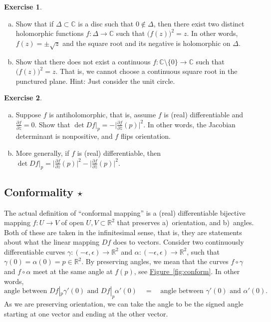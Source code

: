 \documentclass[12pt,openany]{book}
\newcommand{\babs}[1]{\bigl\lvert {#1} \bigr\rvert}
\newcommand{\C}{{\mathbb{C}}}
\newcommand{\R}{{\mathbb{R}}}
\newcommand{\myquote}[1]{``#1''}
\theoremstyle{plain}
\theoremstyle{remark}
\theoremstyle{definition}
\newenvironment{exbox}{%
    \def\FrameCommand{\vrule width 1pt \relax\hspace{10pt}}%
    \MakeFramed{\advance\hsize-\width\FrameRestore}%
}{%
    \endMakeFramed
}
\newenvironment{exparts}{%
    \leavevmode\begin{enumerate}[a),noitemsep,topsep=0pt,parsep=0pt,partopsep=0pt]
}{%
    \end{enumerate}
}
\theoremstyle{exercise}
\newtheorem{exercise}{Exercise}[section]
\theoremstyle{example}
\newcommand{\figureref}[1]{\hyperref[#1]{Figure~\ref*{#1}}}
\begin{document}
\begin{exbox}
\begin{exercise}
\begin{exparts}
\item
Show that if $\Delta \subset \C$ is a disc such that $0 \notin \Delta$, then
there exist two distinct holomorphic functions $f \colon \Delta \to \C$ such that
${\bigl(f(z)\bigr)}^2 = z$.  In other words, $f(z) = \pm \sqrt{z}$ and the
square root and its negative is holomorphic on $\Delta$.
\item
Show that there does not exist a continuous $f \colon \C \setminus \{ 0 \}
\to \C$ such that ${\bigl(f(z)\bigr)}^2 = z$.  That is, we cannot choose a
continuous square root in the punctured plane.  Hint: Just consider the unit
circle.
\end{exparts}
\end{exercise}

\begin{exercise}
\begin{exparts}
\item
Suppose $f$ is antiholomorphic, that is, assume $f$ is (real) differentiable
and $\frac{\partial f}{\partial z} = 0$.  Show that
$\det Df\big|_p = - \babs{\frac{\partial f}{\partial \bar{z}}(p)}^2$.  In other words,
the Jacobian determinant is nonpositive, and $f$ flips orientation.
\item
More generally, if $f$ is (real) differentiable, then
$\det Df\big|_p = \babs{\frac{\partial f}{\partial z}(p)}^2 -
\babs{\frac{\partial f}{\partial \bar{z}}(p)}^2$.
\end{exparts}
\end{exercise}
\end{exbox}

\subsection{Conformality \texorpdfstring{$\star$}{*}}

The actual definition of \myquote{conformal mapping} is 
a (real) differentiable bijective mapping $f \colon U \to V$ of open
$U, V \subset \R^2$ that preserves
a)~orientation, and b)~angles.
Both of these are taken in the infinitesimal sense, that is, they are
statements about what the linear mapping $Df$ does to vectors.
Consider two continuously differentiable curves
$\gamma \colon (-\epsilon,\epsilon) \to \R^2$ and
$\alpha \colon (-\epsilon,\epsilon) \to \R^2$, such that
$\gamma(0)=\alpha(0) = p \in \R^2$.  By preserving angles, we
mean that the curves $f \circ \gamma$ and $f \circ \alpha$ meet at the same
angle at $f(p)$, see \figureref{fig:conform}.  In other words,
\begin{equation*}
\text{angle between } Df|_p \gamma'(0) \text{ and }
Df|_p \alpha'(0)
\quad = \quad
\text{angle between } \gamma'(0) \text{ and } \alpha'(0) .
\end{equation*}
As we are preserving orientation,
we can take the angle to be the signed angle starting at one vector and
ending at the other vector. 
\end{document}
